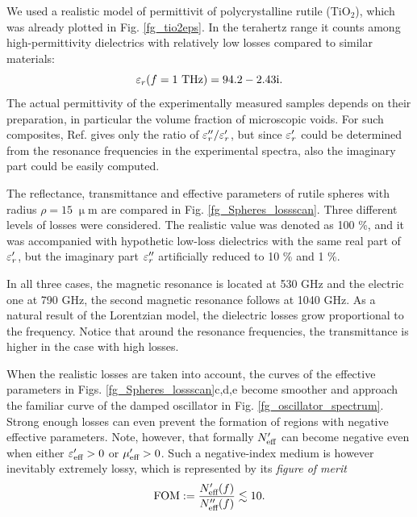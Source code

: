 We used a realistic model \cite{baumard1977_epsilon_TiO2} of permittivit of polycrystalline rutile (TiO$_{2}$), which was already plotted in Fig. \ref{fg_tio2eps}. In the terahertz range it counts among high-permittivity dielectrics with relatively low losses compared to similar materials:
\begin{equation}\varepsilon_r(f=1\text{ THz}) = 94.2-2.43\text{i}. \label{eq_tio2}\end{equation}
The actual permittivity of the experimentally measured samples depends on their preparation, in particular the volume fraction of microscopic voids. For such composites, Ref. \cite{baumard1977_epsilon_TiO2} gives only the ratio of $\varepsilon_r''/\varepsilon_r'$, but since $\varepsilon_r'$ could be determined from the resonance frequencies in the experimental spectra, also the imaginary part could be easily computed.

The reflectance, transmittance and effective parameters of rutile spheres with radius $\rho=15\;\upmu$m are compared in Fig. \ref{fg_Spheres_lossscan}. Three different levels of losses were considered. The realistic value was denoted as 100 \%, and it was accompanied with hypothetic low-loss dielectrics with the same real part of $\varepsilon_r'$, but the imaginary part $\varepsilon_r''$ artificially reduced to  10 \% and 1 \%. 

In all three cases, the magnetic resonance is located at 530 GHz and the electric one at 790 GHz, the second magnetic resonance follows at 1040 GHz. As a natural result of the Lorentzian model, the dielectric losses grow proportional to the frequency. Notice that around the resonance frequencies, the transmittance is higher in the case with high losses.

When the realistic losses are taken into account, the curves of the effective parameters in Figs. \ref{fg_Spheres_lossscan}c,d,e become smoother and approach the familiar curve of the damped oscillator in Fig. \ref{fg_oscillator_spectrum}. Strong enough losses can even prevent the formation of regions with negative effective parameters. Note, however, that formally $N_{\text{eff} }'$ can become negative \cite[pp. 12--15]{pazoutova2011dp} even when either $\varepsilon_{\text{eff} }'>0$ or $\mu_{\text{eff} }'>0$. Such a negative-index medium is however inevitably extremely lossy, which is represented by its \textit{figure of merit}
\begin{equation} \text{FOM} := \frac{N_{\text{eff} }'(f)}{N_{\text{eff} }''(f)} \lesssim 10. \label{eq_fom}\end{equation}

